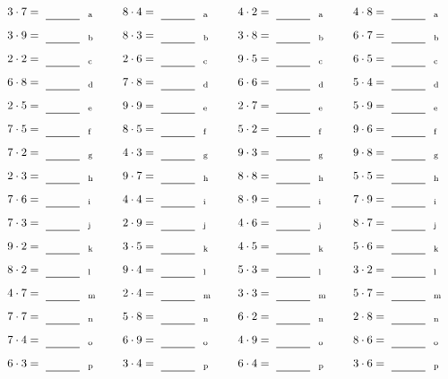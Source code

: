 \documentclass
[
  draft    = true,
  fontsize = 11pt,
  parskip  = half-
]
{scrartcl}
\begin{document}
\par\vfill\par
\begin{align*}
    \pline{3\cdot7}&=\rline{a}
  & \pline{8\cdot4}&=\rline{a}
  & \pline{4\cdot2}&=\rline{a}
  & \pline{4\cdot8}&=\rline{a} \\[1ex]
    \pline{3\cdot9}&=\rline{b}
  & \pline{8\cdot3}&=\rline{b}
  & \pline{3\cdot8}&=\rline{b}
  & \pline{6\cdot7}&=\rline{b} \\[1ex]
    \pline{2\cdot2}&=\rline{c}
  & \pline{2\cdot6}&=\rline{c}
  & \pline{9\cdot5}&=\rline{c}
  & \pline{6\cdot5}&=\rline{c} \\[1ex]
    \pline{6\cdot8}&=\rline{d}
  & \pline{7\cdot8}&=\rline{d}
  & \pline{6\cdot6}&=\rline{d}
  & \pline{5\cdot4}&=\rline{d} \\[1ex]
    \pline{2\cdot5}&=\rline{e}
  & \pline{9\cdot9}&=\rline{e}
  & \pline{2\cdot7}&=\rline{e}
  & \pline{5\cdot9}&=\rline{e} \\[1ex]
    \pline{7\cdot5}&=\rline{f}
  & \pline{8\cdot5}&=\rline{f}
  & \pline{5\cdot2}&=\rline{f}
  & \pline{9\cdot6}&=\rline{f} \\[1ex]
    \pline{7\cdot2}&=\rline{g}
  & \pline{4\cdot3}&=\rline{g}
  & \pline{9\cdot3}&=\rline{g}
  & \pline{9\cdot8}&=\rline{g} \\[1ex]
    \pline{2\cdot3}&=\rline{h}
  & \pline{9\cdot7}&=\rline{h}
  & \pline{8\cdot8}&=\rline{h}
  & \pline{5\cdot5}&=\rline{h} \\[1ex]
    \pline{7\cdot6}&=\rline{i}
  & \pline{4\cdot4}&=\rline{i}
  & \pline{8\cdot9}&=\rline{i}
  & \pline{7\cdot9}&=\rline{i} \\[1ex]
    \pline{7\cdot3}&=\rline{j}
  & \pline{2\cdot9}&=\rline{j}
  & \pline{4\cdot6}&=\rline{j}
  & \pline{8\cdot7}&=\rline{j} \\[1ex]
    \pline{9\cdot2}&=\rline{k}
  & \pline{3\cdot5}&=\rline{k}
  & \pline{4\cdot5}&=\rline{k}
  & \pline{5\cdot6}&=\rline{k} \\[1ex]
    \pline{8\cdot2}&=\rline{l}
  & \pline{9\cdot4}&=\rline{l}
  & \pline{5\cdot3}&=\rline{l}
  & \pline{3\cdot2}&=\rline{l} \\[1ex]
    \pline{4\cdot7}&=\rline{m}
  & \pline{2\cdot4}&=\rline{m}
  & \pline{3\cdot3}&=\rline{m}
  & \pline{5\cdot7}&=\rline{m} \\[1ex]
    \pline{7\cdot7}&=\rline{n}
  & \pline{5\cdot8}&=\rline{n}
  & \pline{6\cdot2}&=\rline{n}
  & \pline{2\cdot8}&=\rline{n} \\[1ex]
    \pline{7\cdot4}&=\rline{o}
  & \pline{6\cdot9}&=\rline{o}
  & \pline{4\cdot9}&=\rline{o}
  & \pline{8\cdot6}&=\rline{o} \\[1ex]
    \pline{6\cdot3}&=\rline{p}
  & \pline{3\cdot4}&=\rline{p}
  & \pline{6\cdot4}&=\rline{p}
  & \pline{3\cdot6}&=\rline{p}
\end{align*}
\end{document}

